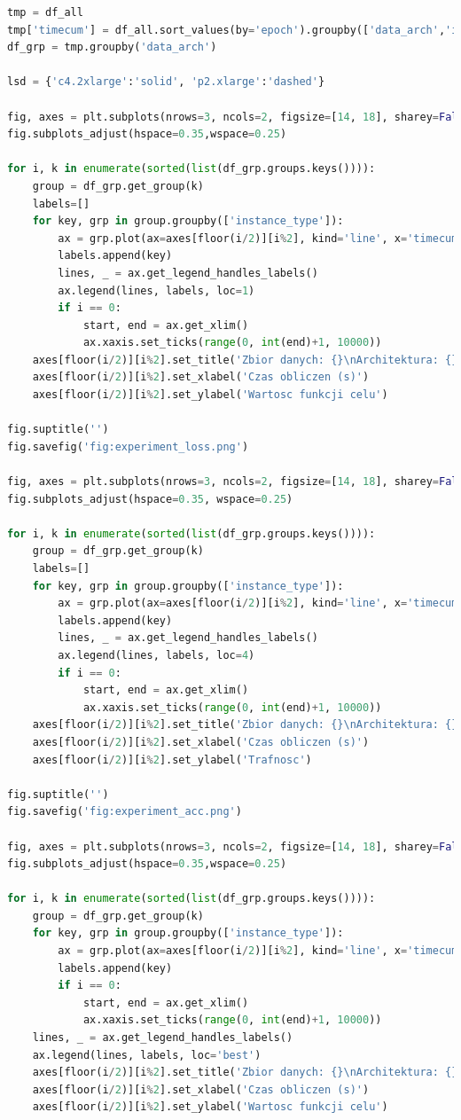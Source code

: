 \documentclass[12pt,a4paper,twoside]{article}
\begin{document}
\begin{appendices}
\begin{lstlisting}[language=python]
tmp = df_all
tmp['timecum'] = df_all.sort_values(by='epoch').groupby(['data_arch','instance_type']).cumsum()['time']
df_grp = tmp.groupby('data_arch')

lsd = {'c4.2xlarge':'solid', 'p2.xlarge':'dashed'}

fig, axes = plt.subplots(nrows=3, ncols=2, figsize=[14, 18], sharey=False)
fig.subplots_adjust(hspace=0.35,wspace=0.25)

for i, k in enumerate(sorted(list(df_grp.groups.keys()))):
    group = df_grp.get_group(k)
    labels=[]
    for key, grp in group.groupby(['instance_type']):
        ax = grp.plot(ax=axes[floor(i/2)][i%2], kind='line', x='timecum', y='loss', c='black', ls=lsd.get(key))
        labels.append(key)
        lines, _ = ax.get_legend_handles_labels()
        ax.legend(lines, labels, loc=1)
        if i == 0:
            start, end = ax.get_xlim()
            ax.xaxis.set_ticks(range(0, int(end)+1, 10000))
    axes[floor(i/2)][i%2].set_title('Zbior danych: {}\nArchitektura: {}'.format(k.split('_')[0], k.split('_')[1]))
    axes[floor(i/2)][i%2].set_xlabel('Czas obliczen (s)')
    axes[floor(i/2)][i%2].set_ylabel('Wartosc funkcji celu')

fig.suptitle('')
fig.savefig('fig:experiment_loss.png')

fig, axes = plt.subplots(nrows=3, ncols=2, figsize=[14, 18], sharey=False)
fig.subplots_adjust(hspace=0.35, wspace=0.25)

for i, k in enumerate(sorted(list(df_grp.groups.keys()))):
    group = df_grp.get_group(k)
    labels=[]
    for key, grp in group.groupby(['instance_type']):
        ax = grp.plot(ax=axes[floor(i/2)][i%2], kind='line', x='timecum', y='acc', c='black', ls=lsd.get(key))
        labels.append(key)
        lines, _ = ax.get_legend_handles_labels()
        ax.legend(lines, labels, loc=4)
        if i == 0:
            start, end = ax.get_xlim()
            ax.xaxis.set_ticks(range(0, int(end)+1, 10000))
    axes[floor(i/2)][i%2].set_title('Zbior danych: {}\nArchitektura: {}'.format(k.split('_')[0], k.split('_')[1]))
    axes[floor(i/2)][i%2].set_xlabel('Czas obliczen (s)')
    axes[floor(i/2)][i%2].set_ylabel('Trafnosc')

fig.suptitle('')
fig.savefig('fig:experiment_acc.png')

fig, axes = plt.subplots(nrows=3, ncols=2, figsize=[14, 18], sharey=False)
fig.subplots_adjust(hspace=0.35,wspace=0.25)

for i, k in enumerate(sorted(list(df_grp.groups.keys()))):
    group = df_grp.get_group(k)
    for key, grp in group.groupby(['instance_type']):
        ax = grp.plot(ax=axes[floor(i/2)][i%2], kind='line', x='timecum', y='val_loss', c='black', ls=lsd.get(key))
        labels.append(key)
        if i == 0:
            start, end = ax.get_xlim()
            ax.xaxis.set_ticks(range(0, int(end)+1, 10000))
    lines, _ = ax.get_legend_handles_labels()
    ax.legend(lines, labels, loc='best')
    axes[floor(i/2)][i%2].set_title('Zbior danych: {}\nArchitektura: {}'.format(k.split('_')[0], k.split('_')[1]))
    axes[floor(i/2)][i%2].set_xlabel('Czas obliczen (s)')
    axes[floor(i/2)][i%2].set_ylabel('Wartosc funkcji celu')


\end{lstlisting}
\end{appendices}
\end{document}

